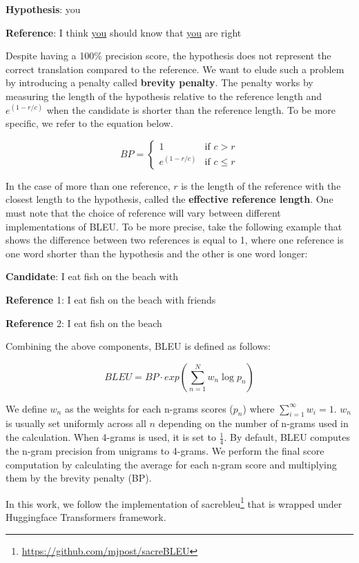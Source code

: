 \textbf{Hypothesis}: you

\textbf{Reference}: I think \underline{you} should know that \underline{you} are right

\bigskip

Despite having a 100\% precision score, the hypothesis does not represent the correct translation compared to the reference. We want to elude such a problem by introducing a penalty called \textbf{brevity penalty}. The penalty works by measuring the length of the hypothesis relative to the reference length and  $e^{(1-r/c)}$ when the candidate is shorter than the reference length. To be more specific, we refer to the equation below.

\begin{equation}
    BP=\begin{cases} 1 & \mbox{if } c>r \\ e^{(1-r/c)} & \mbox{if } c\le r \end{cases}
\end{equation}

In the case of more than one reference, $r$ is the length of the reference with the closest length to the hypothesis, called the \textbf{effective reference length}. One must note that the choice of reference will vary between different implementations of BLEU. To be more precise, take the following example that shows the difference between two references is equal to 1, where one reference is one word shorter than the hypothesis and the other is one word longer:

\bigskip

\textbf{Candidate}: I eat fish on the beach with

\textbf{Reference} 1: I eat fish on the beach with friends

\textbf{Reference} 2: I eat fish on the beach

\bigskip

Combining the above components, BLEU is defined as follows:

\begin{equation}
    BLEU=BP\cdot exp\left( \sum_{n=1}^{N} w_n \log p_n \right)
\end{equation}

We define $w_n$ as the weights for each n-grams scores ($p_n$) where $\sum^{\infty}_{i=1} w_i = 1$. $w_n$ is usually set uniformly across all $n$ depending on the number of n-grams used in the calculation. When 4-grams is used, it is set to $\frac{1}{4}$. By default, BLEU computes the n-gram precision from unigrams to 4-grams. We perform the final score computation by calculating the average for each n-gram score and multiplying them by the brevity penalty (BP).

In this work, we follow the implementation of sacrebleu\footnote{\url{https://github.com/mjpost/sacreBLEU}}  that is wrapped under Huggingface Transformers framework.